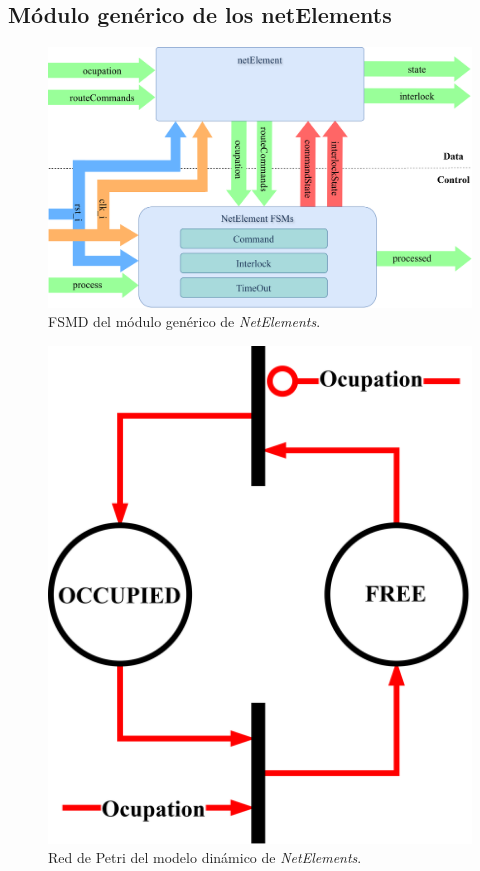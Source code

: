 \subsection{Módulo genérico de los netElements}

\lipsum[1]

\begin{figure}[H]
	\centering
	\includegraphics[width=1\textwidth]{Figuras/NET_module}
	\centering\caption{FSMD del módulo genérico de \textit{NetElements}.}
	\label{fig:NET_module}
\end{figure}

\lipsum[1]

\begin{figure}[H]
	\centering
	\includegraphics[width=1\textwidth]{Figuras/NET_Petri}
	\centering\caption{Red de Petri del modelo dinámico de \textit{NetElements}.}
	\label{fig:NET_Petri}
\end{figure}

\lipsum[1]
